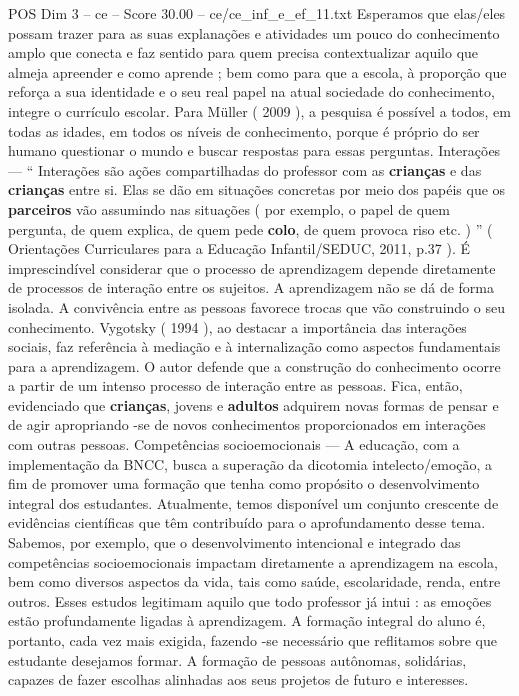 \begin{textsample}{POS Dim 3 – ce – Score 30.00 – ce/ce\_inf\_e\_ef\_11.txt}
Esperamos que elas/eles possam trazer para as suas explanações e atividades um pouco do conhecimento amplo que conecta e faz sentido para quem precisa contextualizar aquilo que almeja apreender e como aprende ; bem como para que a escola, à proporção que reforça a sua identidade e o seu real papel na atual sociedade do conhecimento, integre o currículo escolar.
Para Müller ( 2009 ), a pesquisa é possível a todos, em todas as idades, em todos os níveis de conhecimento, porque é próprio do ser humano questionar o mundo e buscar respostas para essas perguntas.
Interações — “ Interações são ações compartilhadas do professor com as \textbf{crianças} e das \textbf{crianças} entre si.
Elas se dão em situações concretas por meio dos papéis que os \textbf{parceiros} vão assumindo nas situações ( por exemplo, o papel de quem pergunta, de quem explica, de quem pede \textbf{colo}, de quem provoca riso etc. ) ” ( Orientações Curriculares para a Educação Infantil/SEDUC, 2011, p.37 ).
É imprescindível considerar que o processo de aprendizagem depende diretamente de processos de interação entre os sujeitos.
A aprendizagem não se dá de forma isolada.
A convivência entre as pessoas favorece trocas que vão construindo o seu conhecimento.
Vygotsky ( 1994 ), ao destacar a importância das interações sociais, faz referência à mediação e à internalização como aspectos fundamentais para a aprendizagem.
O autor defende que a construção do conhecimento ocorre a partir de um intenso processo de interação entre as pessoas.
Fica, então, evidenciado que \textbf{crianças}, jovens e \textbf{adultos} adquirem novas formas de pensar e de agir apropriando -se de novos conhecimentos proporcionados em interações com outras pessoas.
Competências socioemocionais — A educação, com a implementação da BNCC, busca a superação da dicotomia intelecto/emoção, a fim de promover uma formação que tenha como propósito o desenvolvimento integral dos estudantes.
Atualmente, temos disponível um conjunto crescente de evidências científicas que têm contribuído para o aprofundamento desse tema.
Sabemos, por exemplo, que o desenvolvimento intencional e integrado das competências socioemocionais impactam diretamente a aprendizagem na escola, bem como diversos aspectos da vida, tais como saúde, escolaridade, renda, entre outros.
Esses estudos legitimam aquilo que todo professor já intui : as emoções estão profundamente ligadas à aprendizagem.
A formação integral do aluno é, portanto, cada vez mais exigida, fazendo -se necessário que reflitamos sobre que estudante desejamos formar.
A formação de pessoas autônomas, solidárias, capazes de fazer escolhas alinhadas aos seus projetos de futuro e interesses.

\end{textsample}
